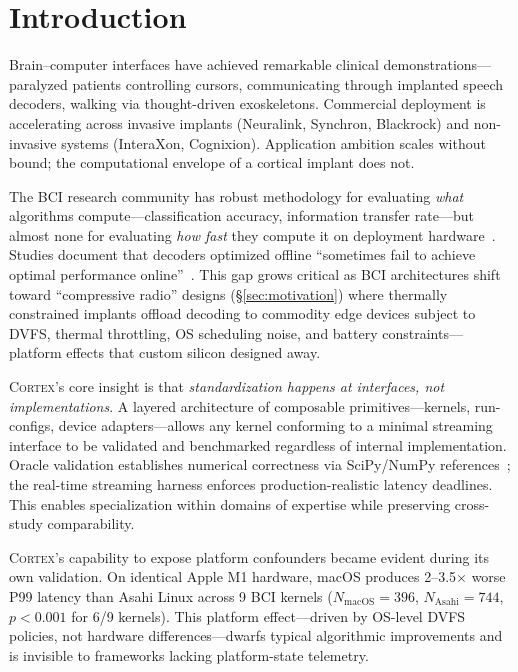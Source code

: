 \documentclass[sigplan,10pt]{acmart}
\newcommand{\cortex}{\textsc{Cortex}}
\begin{document}
\section{Introduction}

Brain--computer interfaces have achieved remarkable clinical demonstrations---paralyzed patients controlling cursors, communicating through implanted speech decoders, walking via thought-driven exoskeletons. Commercial deployment is accelerating across invasive implants (Neuralink, Synchron, Blackrock) and non-invasive systems (InteraXon, Cognixion). Application ambition scales without bound; the computational envelope of a cortical implant does not.

The BCI research community has robust methodology for evaluating \emph{what} algorithms compute---classification accuracy, information transfer rate---but almost none for evaluating \emph{how fast} they compute it on deployment hardware~\cite{liu2021edge}. Studies document that decoders optimized offline ``sometimes fail to achieve optimal performance online''~\cite{willett2019principled}. This gap grows critical as BCI architectures shift toward ``compressive radio'' designs (\S\ref{sec:motivation}) where thermally constrained implants offload decoding to commodity edge devices subject to DVFS, thermal throttling, OS scheduling noise, and battery constraints---platform effects that custom silicon designed away.

\cortex{}'s core insight is that \emph{standardization happens at interfaces, not implementations}. A layered architecture of composable primitives---kernels, run-configs, device adapters---allows any kernel conforming to a minimal streaming interface to be validated and benchmarked regardless of internal implementation. Oracle validation establishes numerical correctness via SciPy/NumPy references~\cite{virtanen2020scipy,harris2020numpy}; the real-time streaming harness enforces production-realistic latency deadlines. This enables specialization within domains of expertise while preserving cross-study comparability.

\cortex{}'s capability to expose platform confounders became evident during its own validation. On identical Apple M1 hardware, macOS produces 2--3.5$\times$ worse P99 latency than Asahi Linux across 9 BCI kernels ($N_{\text{macOS}} = 396$, $N_{\text{Asahi}} = 744$, $p < 0.001$ for 6/9 kernels). This platform effect---driven by OS-level DVFS policies, not hardware differences---dwarfs typical algorithmic improvements and is invisible to frameworks lacking platform-state telemetry.
\end{document}
